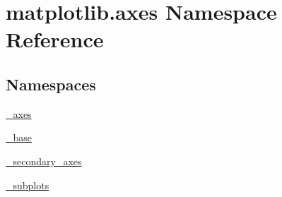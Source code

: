 \hypertarget{namespacematplotlib_1_1axes}{}\section{matplotlib.\+axes Namespace Reference}
\label{namespacematplotlib_1_1axes}
\subsection*{Namespaces}
\begin{DoxyCompactItemize}
\item 
 \hyperlink{namespacematplotlib_1_1axes_1_1__axes}{\+\_\+axes}
\item 
 \hyperlink{namespacematplotlib_1_1axes_1_1__base}{\+\_\+base}
\item 
 \hyperlink{namespacematplotlib_1_1axes_1_1__secondary__axes}{\+\_\+secondary\+\_\+axes}
\item 
 \hyperlink{namespacematplotlib_1_1axes_1_1__subplots}{\+\_\+subplots}
\end{DoxyCompactItemize}

